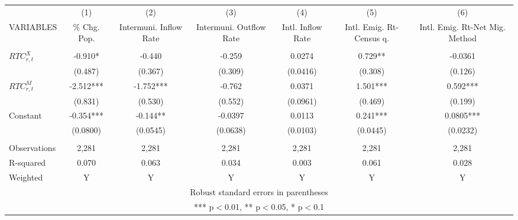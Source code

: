 \begin{tabular}{lcccccc} \hline
 & (1) & (2) & (3) & (4) & (5) & (6) \\
VARIABLES & \% Chg. Pop. & Intermuni. Inflow Rate & Intermuni. Outflow Rate & Intl. Inflow Rate & Intl. Emig. Rt-Census q. & Intl. Emig. Rt-Net Mig. Method \\ \hline
 &  &  &  &  &  &  \\
$ RTC_{r,t}^X$ & -0.910* & -0.440 & -0.259 & 0.0274 & 0.729** & -0.0361 \\
 & (0.487) & (0.367) & (0.309) & (0.0416) & (0.308) & (0.126) \\
$ RTC_{r,t}^M$ & -2.512*** & -1.752*** & -0.762 & 0.0371 & 1.501*** & 0.592*** \\
 & (0.831) & (0.530) & (0.552) & (0.0961) & (0.469) & (0.199) \\
Constant & -0.354*** & -0.144** & -0.0397 & 0.0113 & 0.241*** & 0.0805*** \\
 & (0.0800) & (0.0545) & (0.0638) & (0.0103) & (0.0445) & (0.0232) \\
 &  &  &  &  &  &  \\
Observations & 2,281 & 2,281 & 2,281 & 2,281 & 2,281 & 2,281 \\
R-squared & 0.070 & 0.063 & 0.034 & 0.003 & 0.061 & 0.028 \\
 Weighted & Y & Y & Y & Y & Y & Y \\ \hline
\multicolumn{7}{c}{ Robust standard errors in parentheses} \\
\multicolumn{7}{c}{ *** p$<$0.01, ** p$<$0.05, * p$<$0.1} \\
\end{tabular}
